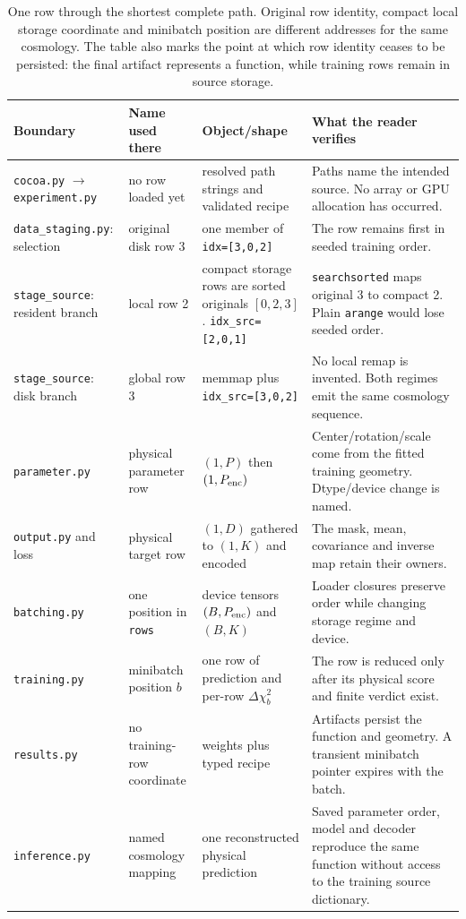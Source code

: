 \documentclass[10pt,aps,prd,twocolumn,nofootinbib]{revtex4-2}
\newcommand{\code}[1]{\texttt{#1}}
\begin{document}
\begin{table}[t]
\centering
\begin{tabular}{p{}p{}p{}p{}}
\toprule
Boundary & Name used there & Object/shape & What the reader verifies \\
\midrule
\code{cocoa.py} $\rightarrow$ \code{experiment.py} & no row loaded yet &
resolved path strings and validated recipe & Paths name the intended source.
No array or GPU allocation has occurred.  \\
\code{data\_staging.py}: selection & original disk row 3 & one member of
\code{idx=[3,0,2]} & The row remains first in seeded training order.  \\
\code{stage\_source}: resident branch & local row 2 & compact storage rows are
sorted originals $[0,2,3]$.  \code{idx\_src=[2,0,1]} &
\code{searchsorted} maps original 3 to compact 2.  Plain \code{arange} would
lose seeded order.  \\
\code{stage\_source}: disk branch & global row 3 & memmap plus
\code{idx\_src=[3,0,2]} & No local remap is invented.  Both regimes emit the
same cosmology sequence.  \\
\code{parameter.py} & physical parameter row & $(1,P)$ then $(1,P_{\rm enc})$ &
Center/rotation/scale come from the fitted training geometry.  Dtype/device
change is named.  \\
\code{output.py} and loss & physical target row & $(1,D)$ gathered to
$(1,K)$ and encoded & The mask, mean, covariance and inverse map retain their
owners.  \\
\code{batching.py} & one position in \code{rows} & device tensors
$(B,P_{\rm enc})$ and $(B,K)$ & Loader closures preserve order while changing
storage regime and device.  \\
\code{training.py} & minibatch position $b$ & one row of prediction and
per-row $\Delta\chi_b^2$ & The row is reduced only after its physical score
and finite verdict exist.  \\
\code{results.py} & no training-row coordinate & weights plus typed recipe &
Artifacts persist the function and geometry.  A transient minibatch pointer
expires with the batch.  \\
\code{inference.py} & named cosmology mapping & one reconstructed physical
prediction & Saved parameter order, model and decoder reproduce the same
function without access to the training source dictionary.  \\
\bottomrule
\end{tabular}
\caption{One row through the shortest complete path.  Original row identity,
compact local storage coordinate and minibatch position are different
addresses for the same cosmology.  The table also marks the point at which row
identity ceases to be persisted: the final artifact represents a function,
while training rows remain in source storage.}
\label{tab:one-row-study-trace}
\end{table}
\end{document}
